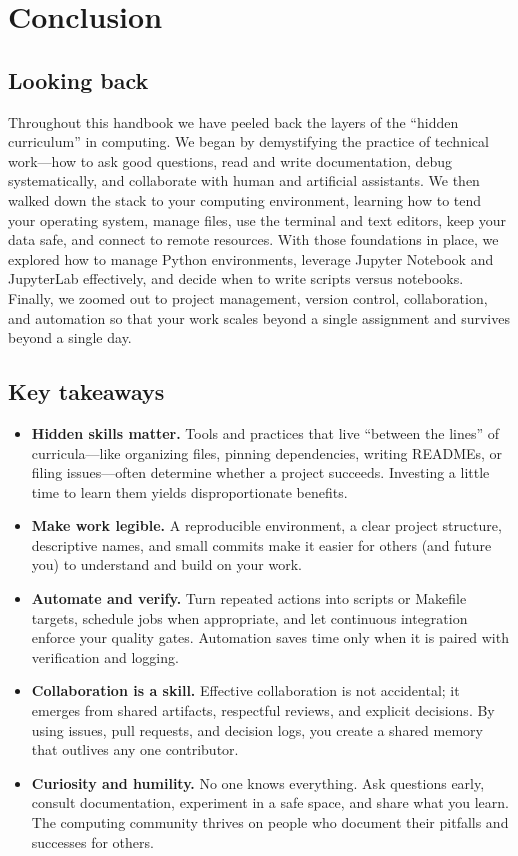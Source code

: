 \chapter{Conclusion}

\section*{Looking back}
Throughout this handbook we have peeled back the layers of the ``hidden curriculum'' in computing.  We began by demystifying the practice of technical work—how to ask good questions, read and write documentation, debug systematically, and collaborate with human and artificial assistants.  We then walked down the stack to your computing environment, learning how to tend your operating system, manage files, use the terminal and text editors, keep your data safe, and connect to remote resources.  With those foundations in place, we explored how to manage Python environments, leverage Jupyter Notebook and JupyterLab effectively, and decide when to write scripts versus notebooks.  Finally, we zoomed out to project management, version control, collaboration, and automation so that your work scales beyond a single assignment and survives beyond a single day.

\section*{Key takeaways}
\begin{itemize}
  \item \textbf{Hidden skills matter.} Tools and practices that live ``between the lines'' of curricula—like organizing files, pinning dependencies, writing READMEs, or filing issues—often determine whether a project succeeds.  Investing a little time to learn them yields disproportionate benefits.
  \item \textbf{Make work legible.} A reproducible environment, a clear project structure, descriptive names, and small commits make it easier for others (and future you) to understand and build on your work.
  \item \textbf{Automate and verify.} Turn repeated actions into scripts or Makefile targets, schedule jobs when appropriate, and let continuous integration enforce your quality gates.  Automation saves time only when it is paired with verification and logging.
  \item \textbf{Collaboration is a skill.} Effective collaboration is not accidental; it emerges from shared artifacts, respectful reviews, and explicit decisions.  By using issues, pull requests, and decision logs, you create a shared memory that outlives any one contributor.
  \item \textbf{Curiosity and humility.} No one knows everything.  Ask questions early, consult documentation, experiment in a safe space, and share what you learn.  The computing community thrives on people who document their pitfalls and successes for others.
\end{itemize}

